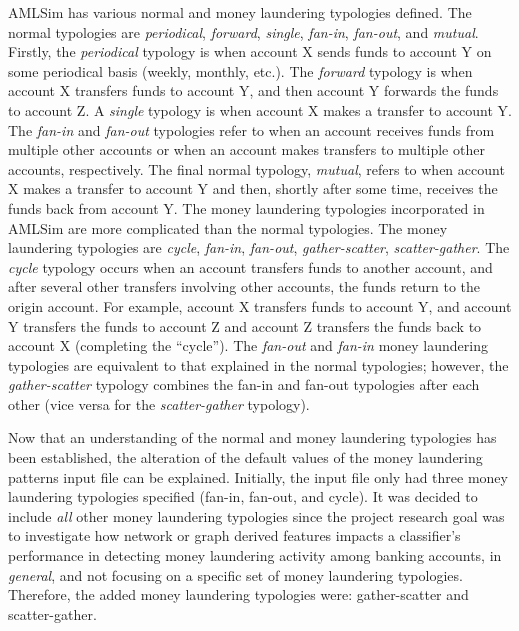 AMLSim has various normal and money laundering typologies defined. The normal typologies are \textit{periodical}, \textit{forward}, \textit{single}, \textit{fan-in}, \textit{fan-out}, and \textit{mutual}. Firstly, the \textit{periodical} typology is when account X sends funds to account Y on some periodical basis (weekly, monthly, etc.). The \textit{forward} typology is when account X transfers funds to account Y, and then account Y forwards the funds to account Z. A \textit{single} typology is when account X makes a transfer to account Y. The \textit{fan-in} and \textit{fan-out} typologies refer to when an account receives funds from multiple other accounts or when an account makes transfers to multiple other accounts, respectively. The final normal typology, \textit{mutual}, refers to when account X makes a transfer to account Y and then, shortly after some time, receives the funds back from account Y. The money laundering typologies incorporated in AMLSim are more complicated than the normal typologies. The money laundering typologies are \textit{cycle}, \textit{fan-in}, \textit{fan-out}, \textit{gather-scatter}, \textit{scatter-gather}. The \textit{cycle} typology occurs when an account transfers funds to another account, and after several other transfers involving other accounts, the funds return to the origin account. For example, account X transfers funds to account Y, and account Y transfers the funds to account Z and account Z transfers the funds back to account X (completing the ``cycle''). The \textit{fan-out} and \textit{fan-in} money laundering typologies are equivalent to that explained in the normal typologies; however, the \textit{gather-scatter} typology combines the fan-in and fan-out typologies after each other (vice versa for the \textit{scatter-gather} typology).      

Now that an understanding of the normal and money laundering typologies has been established, the alteration of the default values of the money laundering patterns input file can be explained. Initially, the input file only had three money laundering typologies specified (fan-in, fan-out, and cycle). It was decided to include \textit{all} other money laundering typologies since the project research goal was to investigate how network or graph derived features impacts a classifier's performance in detecting money laundering activity among banking accounts, in \textit{general}, and not focusing on a specific set of money laundering typologies. Therefore, the added money laundering typologies were: gather-scatter and scatter-gather.

